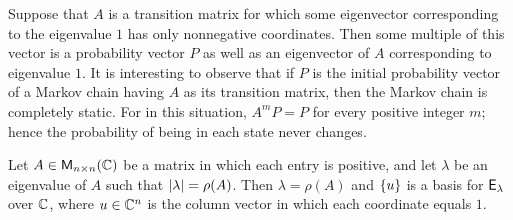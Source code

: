 \begin{note}
  Suppose that \(A\) is a transition matrix for which some eigenvector corresponding to the eigenvalue \(1\) has only nonnegative coordinates.
  Then some multiple of this vector is a probability vector \(P\) as well as an eigenvector of \(A\) corresponding to eigenvalue \(1\).
  It is interesting to observe that if \(P\) is the initial probability vector of a Markov chain having \(A\) as its transition matrix, then the Markov chain is completely static.
  For in this situation, \(A^m P = P\) for every positive integer \(m\);
  hence the probability of being in each state never changes.
\end{note}

\begin{thm}\label{5.18}
  Let \(A \in \ms[n][n][\C]\) be a matrix in which each entry is positive, and let \(\lambda\) be an eigenvalue of \(A\) such that \(\left\lvert\lambda\right\rvert = \rho(A)\).
  Then \(\lambda = \rho(A)\) and \(\left\lbrace u\right\rbrace\) is a basis for \(\mathsf{E}_{\lambda}\) over \(\mathbb{C}\), where \(u \in \mathbb{C}^n\) is the column vector in which each coordinate equals \(1\).
\end{thm}

